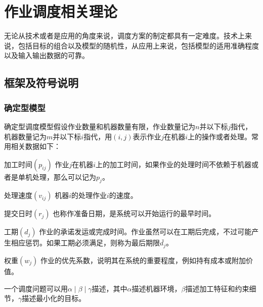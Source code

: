 \chapter{作业调度相关理论}
无论从技术或者是应用的角度来说，调度方案的制定都具有一定难度。技术上来说，包括目标的组合以及模型的随机性，从应用上来说，包括模型的适用准确程度以及输入输出数据的可靠\cite{pinedo}。

\section{框架及符号说明}
\subsection{确定型模型}
确定型调度模型假设作业数量和机器数量有限，作业数量记为$n$并以下标$j$指代，机器数量记为$m$并以下标$i$指代，用$(i,j)$表示作业$j$在机器$i$上的操作或者处理。常用相关数据如下：
\renewcommand{\descriptionlabel}[1]{\heiti{#1}}
\begin{compactdesc}
\item[加工时间$(p_{ij})$]作业$j$在机器$i$上的加工时间，如果作业的处理时间不依赖于机器或者是单机处理，那么可以记为$p_j$。
\item[处理速度$(v_{ij})$]机器$i$的处理作业$i$的速度。
\item[提交日时$(r_j)$]也称作准备日期，是系统可以开始运行的最早时间。
\item[工期$(d_j)$]作业的承诺发运或完成时间。作业虽然可以在工期后完成，不过可能产生相应惩罚。如果工期必须满足，则称为最后期限$\bar{d_j}$。
\item[权重$(w_j)$]作业的优先系数，说明其在系统的重要程度，例如持有成本或附加价值。
\end{compactdesc}

一个调度问题可以用$\alpha\mid\beta\mid\gamma$描述，其中$\alpha$描述机器环境，$\beta$描述加工特征和约束细节，$\gamma$描述最小化的目标。

